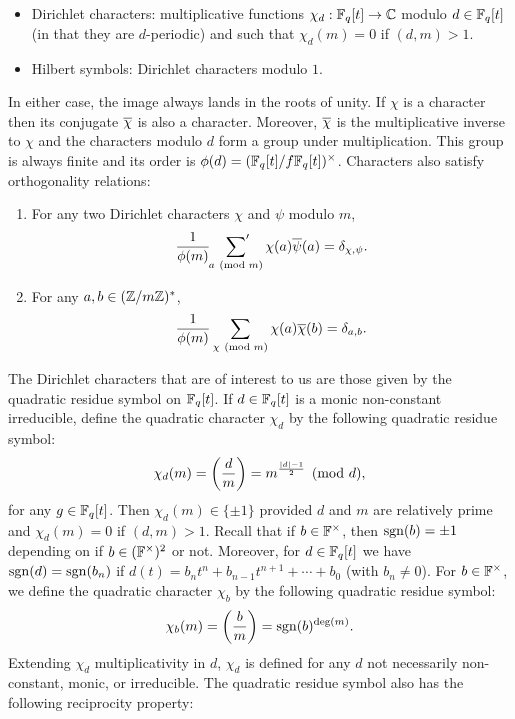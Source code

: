 \documentclass[12pt,reqno,oneside]{amsart}
\begin{document}
    \begin{itemize}
        \item Dirichlet characters: multiplicative functions $\chi_{d}:\mathbb{F}_{q}[t] \to \mathbb{C}$ modulo $d \in \mathbb{F}_{q}[t]$ (in that they are $d$-periodic) and such that $\chi_{d}(m) = 0$ if $(d,m) > 1$.
        \item Hilbert symbols: Dirichlet characters modulo $1$.
    \end{itemize}
    
    In either case, the image always lands in the roots of unity. If $\chi$ is a character then its conjugate $\overline{\chi}$ is also a character. Moreover, $\overline{\chi}$ is the multiplicative inverse to $\chi$ and the characters modulo $d$ form a group under multiplication. This group is always finite and its order is $\phi(d) = (\mathbb{F}_{q}[t]/f\mathbb{F}_{q}[t])^{\times}$. Characters also satisfy orthogonality relations:

    \begin{theorem}
        \phantom{ }
        \begin{enumerate}[label=(\roman*)]
          \item For any two Dirichlet characters $\chi$ and $\psi$ modulo $m$,
          \[
            \frac{1}{\phi(m)}\sideset{}{'}\sum_{a \ \left(\text{mod }m\right)}\chi(a)\overline{\psi}(a) = \delta_{\chi,\psi}.
          \]
          \item For any $a,b \in (\mathbb{Z}/m\mathbb{Z})^{\ast}$,
          \[
            \frac{1}{\phi(m)}\sum_{\chi \ \left(\text{mod }m\right)}\chi(a)\overline{\chi}(b) = \delta_{a,b}.
          \]
        \end{enumerate}
    \end{theorem}

    The Dirichlet characters that are of interest to us are those given by the quadratic residue symbol on $\mathbb{F}_{q}[t]$. If $d \in \mathbb{F}_{q}[t]$ is a monic non-constant irreducible, define the quadratic character $\chi_{d}$ by the following quadratic residue symbol:
    \[
        \chi_{d}(m) = \left(\frac{d}{m}\right) = m^{\frac{|d|-1}{2}} \pmod{d},
    \]
    for any $g \in \mathbb{F}_{q}[t]$. Then $\chi_{d}(m) \in \{\pm 1\}$ provided $d$ and $m$ are relatively prime and $\chi_{d}(m) = 0$ if $(d,m) > 1$. Recall that if $b \in \mathbb{F}^{\times}$, then $\operatorname{\mathrm{sgn}}(b) = \pm1$ depending on if $b \in (\mathbb{F}^{\times})^{2}$ or not. Moreover, for $d \in \mathbb{F}_{q}[t]$ we have $\operatorname{\mathrm{sgn}}(d) = \operatorname{\mathrm{sgn}}(b_{n})$ if $d(t) = b_{n}t^{n}+b_{n-1}t^{n+1}+\cdots+b_{0}$ (with $b_{n} \neq 0$). For $b \in \mathbb{F}^{\times}$, we define the quadratic character $\chi_{b}$ by the following quadratic residue symbol:
    \[
        \chi_{b}(m) = \left(\frac{b}{m}\right) = \operatorname{\mathrm{sgn}}(b)^{\deg(m)}.
    \]
    Extending $\chi_{d}$ multiplicativity in $d$, $\chi_{d}$ is defined for any $d$ not necessarily non-constant, monic, or irreducible. The quadratic residue symbol also has the following reciprocity property:
\end{document}
